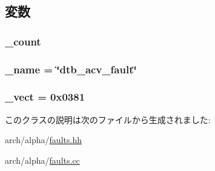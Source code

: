 \subsection{変数}
\hypertarget{classAlphaISA_1_1DtbAcvFault_a4bff925c412f331c5aaf6a39b79619ff}{
\subsubsection[{\_\-count}]{ {\bf \_\-count}}}
\label{classAlphaISA_1_1DtbAcvFault_a4bff925c412f331c5aaf6a39b79619ff}
\hypertarget{classAlphaISA_1_1DtbAcvFault_ac79073ffcd2c66a09bcd3bd3ad206019}{
\subsubsection[{\_\-name}]{ {\bf \_\-name} = \char`\"{}dtb\_\-acv\_\-fault\char`\"{}}}
\label{classAlphaISA_1_1DtbAcvFault_ac79073ffcd2c66a09bcd3bd3ad206019}
\hypertarget{classAlphaISA_1_1DtbAcvFault_ad9e5855b9db0b2824cf6c507be4a872e}{
\subsubsection[{\_\-vect}]{ {\bf \_\-vect} = 0x0381}}
\label{classAlphaISA_1_1DtbAcvFault_ad9e5855b9db0b2824cf6c507be4a872e}


このクラスの説明は次のファイルから生成されました:\begin{DoxyCompactItemize}
\item 
arch/alpha/\hyperlink{arch_2alpha_2faults_8hh}{faults.hh}\item 
arch/alpha/\hyperlink{arch_2alpha_2faults_8cc}{faults.cc}\end{DoxyCompactItemize}
